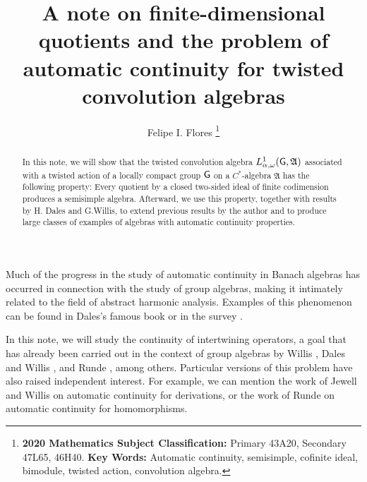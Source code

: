 \documentclass[11pt]{article}
\date{}
\newcommand{\A}{\mathfrak{A}}
\def\G{{\sf G}}
\theoremstyle{definition}
\theoremstyle{remark}
\numberwithin{equation}{section}
\numberwithin{equation}{section}
\begin{document}

\title{A note on finite-dimensional quotients and the problem of automatic continuity for twisted convolution algebras}



\author{Felipe I. Flores
\footnote{
\textbf{2020 Mathematics Subject Classification:} Primary 43A20, Secondary 47L65, 46H40.
\newline
\textbf{Key Words:} Automatic continuity, semisimple, cofinite ideal, bimodule, twisted action, convolution algebra. }
}

\maketitle


\begin{abstract}
In this note, we will show that the twisted convolution algebra $L^1_{\alpha,\omega}(\G,\A)$ associated with a twisted action of a locally compact group $\G$ on a $C^*$-algebra $\A$ has the following property: Every quotient by a closed two-sided ideal of finite codimension produces a semisimple algebra. Afterward, we use this property, together with results by H. Dales and G.Willis, to extend previous results by the author and to produce large classes of examples of algebras with automatic continuity properties.


\end{abstract}


\bigskip
\bigskip
Much of the progress in the study of automatic continuity in Banach algebras has occurred in connection with the study of group algebras, making it intimately related to the field of abstract harmonic analysis. Examples of this phenomenon can be found in Dales's famous book \cite{Da00} or in the survey \cite{Da78}.

In this note, we will study the continuity of intertwining operators, a goal that has already been carried out in the context of group algebras by Willis \cite{Wi80}, Dales and Willis \cite{DaWi83}, and Runde \cite{Ru96}, among others. Particular versions of this problem have also raised independent interest. For example, we can mention the work of Jewell \cite{Je77} and Willis \cite{Wi92} on automatic continuity for derivations, or the work of Runde \cite{Ru94} on automatic continuity for homomorphisms.
\end{document}
